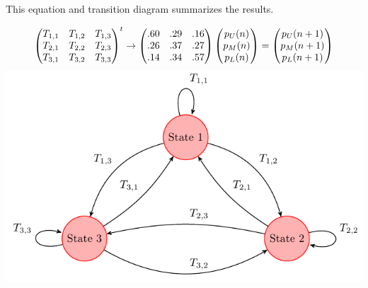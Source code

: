 \documentclass[c]{beamer}
\begin{document}
\begin{frame}
This equation and transition diagram summarizes the results.

  \begin{center}
\begin{equation*}
  \begin{pmatrix}
    T_{1,1}  &T_{1,2}  &T_{1,3}  \\
    T_{2,1}  &T_{2,2}  &T_{2,3}  \\
    T_{3,1}  &T_{3,2}  &T_{3,3}
  \end{pmatrix}^t
\rightarrow
    \begin{pmatrix}
      .60  &.29  &.16  \\
      .26  &.37  &.27  \\
      .14  &.34  &.57
    \end{pmatrix}
    \begin{pmatrix} p_{U}(n) \\ p_{M}(n) \\ p_{L}(n) \end{pmatrix}
    =\begin{pmatrix} p_{U}(n+1) \\ p_{M}(n+1) \\ p_{L}(n+1) \end{pmatrix}
  \end{equation*}
    \includegraphics[width=0.7\linewidth]{../figures/transitiondiagram.pdf}
  \end{center}
\end{frame}
\end{document}
